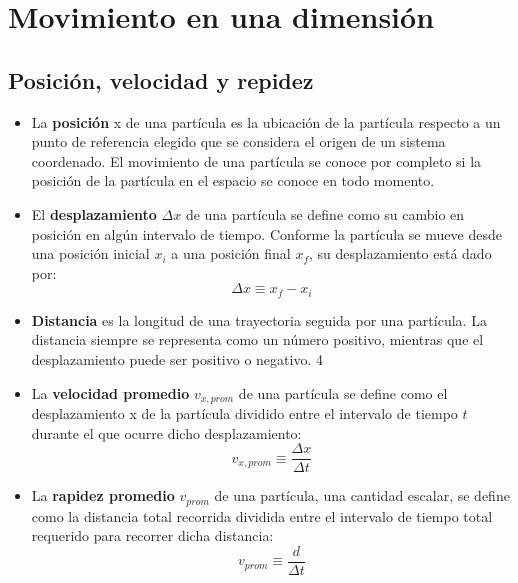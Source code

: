 \section{Movimiento en una dimensión}
  \subsection{Posición, velocidad y repidez}
    \begin{itemize}
      \item La \textbf{posición} x de una partícula es la ubicación de la partícula respecto a un punto de referencia
      elegido que se considera el origen de un sistema coordenado. El movimiento de una partícula se conoce por completo
      si la posición de la partícula en el espacio se conoce en todo momento.

      \item El \textbf{desplazamiento} $\Delta x$ de una partícula se define como su cambio en posición en algún
      intervalo de tiempo. Conforme la partícula se mueve desde una posición inicial $x_{i}$ a una posición final
      $x_{f}$, su desplazamiento está dado por:
      \begin{equation*}
        \Delta x \equiv x_{f} - x_{i}
      \end{equation*}

      \item \textbf{Distancia} es la longitud de una trayectoria seguida por una partícula. La distancia siempre se
      representa como un número positivo, mientras que el desplazamiento puede ser positivo o negativo.
4
      \item La \textbf{velocidad promedio} $v_{x,prom}$ de una partícula se define como el desplazamiento x de la
      partícula dividido entre el intervalo de tiempo $t$ durante el que ocurre dicho desplazamiento:
      \begin{equation*}
        v_{x,prom} \equiv \frac{\Delta x}{\Delta t}
      \end{equation*}

      \item La \textbf{rapidez promedio} $v_{prom}$ de una partícula, una cantidad escalar, se define como la distancia
      total recorrida dividida entre el intervalo de tiempo total requerido para recorrer dicha distancia:
      \begin{equation*}
        v_{prom} \equiv \frac{d}{\Delta t}
      \end{equation*}
    \end{itemize}

